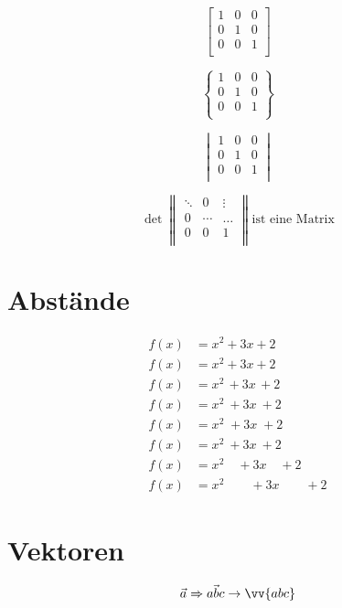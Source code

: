 \documentclass[12pt,ngerman,parskip=half]{scrartcl}
\begin{document}
\[%
\begin{bmatrix} 
1 & 0 & 0 \\ 
0 & 1 & 0 \\ 
0 & 0 & 1 \\ 
\end{bmatrix}
\]

\[%
\begin{Bmatrix} 
1 & 0 & 0 \\ 
0 & 1 & 0 \\ 
0 & 0 & 1 \\ 
\end{Bmatrix}
\]


\[%
\begin{vmatrix} 
1 & 0 & 0 \\ 
0 & 1 & 0 \\ 
0 & 0 & 1 \\ 
\end{vmatrix}
\]

\[%
\det 
\begin{Vmatrix} 
\ddots  & 0 & \vdots \\ 
0 & \cdots & \dots \\ 
0 & 0 & 1 \\ 
\end{Vmatrix}
\text{ist eine Matrix}
\]

\section{Abstände}


\begin{align*}
f(x) &= x^2\! +3x\! +2 \\
f(x) &= x^2+3x+2 \\
f(x) &= x^2\, +3x\, +2 \\
f(x) &= x^2\: +3x\: +2 \\
f(x) &= x^2\; +3x\; +2 \\
f(x) &= x^2\ +3x\ +2 \\
f(x) &= x^2\quad +3x\quad +2 \\
f(x) &= x^2\qquad +3x\qquad +2
\end{align*}

\section{Vektoren}

\begin{equation} %
\vec{a} \Rightarrow \vec{abc} \rightarrow  \vv{abc}
\end{equation}
\end{document}
